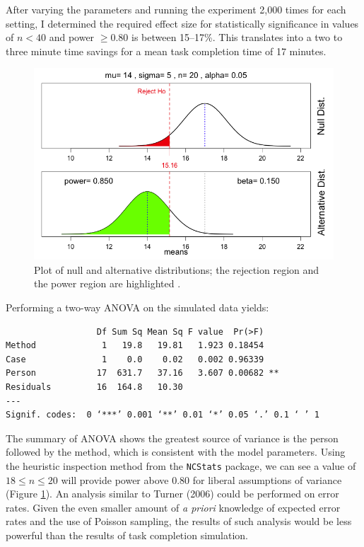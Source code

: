 \documentclass[11pt]{article}
\begin{document}
After varying the parameters and running the experiment 2,000 times for each setting, I determined the required effect size for statistically significance in values of $n < 40$ and power $\ge 0.80$ is between 15--17\%. This translates into a two to three minute time savings for a mean task completion time of 17 minutes.

\begin{figure}[h!t]
\begin{center}
\includegraphics[width=\textwidth]{pwranal1.png}
\end{center}
\caption{Plot of null and alternative distributions; the rejection region and the power region are highlighted \cite{Ogle:2012qf}.}\label{pwranal} 
\end{figure}

\noindent Performing a two-way ANOVA on the simulated data yields: 
\begin{verbatim}
                  Df Sum Sq Mean Sq F value  Pr(>F)   
Method             1   19.8   19.81   1.923 0.18454   
Case               1    0.0    0.02   0.002 0.96339   
Person            17  631.7   37.16   3.607 0.00682 **
Residuals         16  164.8   10.30                   
---
Signif. codes:  0 ‘***’ 0.001 ‘**’ 0.01 ‘*’ 0.05 ‘.’ 0.1 ‘ ’ 1 
\end{verbatim}
\noindent The summary of ANOVA shows the greatest source of variance is the person followed by the method, which is consistent with the model parameters. Using the heuristic inspection method from the \texttt{NCStats} package, we can see a value of $18 \le n \le 20$ will provide power above 0.80 for liberal assumptions of variance (Figure \ref{pwranal}). An analysis similar to Turner (2006) could be performed on error rates. Given the even smaller amount of \textit{a priori} knowledge of expected error rates and the use of Poisson sampling, the results of such analysis would be less powerful than the results of task completion simulation.
\end{document}
